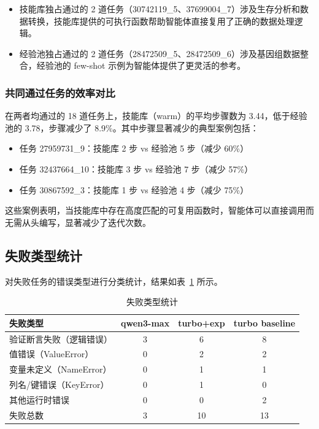 \begin{itemize}
    \item 技能库独占通过的 2 道任务（30742119\_5、37699004\_7）涉及生存分析和数据转换，技能库提供的可执行函数帮助智能体直接复用了正确的数据处理逻辑。
    \item 经验池独占通过的 2 道任务（28472509\_5、28472509\_6）涉及基因组数据整合，经验池的 few-shot 示例为智能体提供了更灵活的参考。
\end{itemize}

\subsubsection{共同通过任务的效率对比}

在两者均通过的 18 道任务上，技能库（warm）的平均步骤数为 3.44，低于经验池的 3.78，步骤减少了 8.9\%。其中步骤显著减少的典型案例包括：

\begin{itemize}
    \item 任务 27959731\_9：技能库 2 步 vs 经验池 5 步（减少 60\%）
    \item 任务 32437664\_10：技能库 3 步 vs 经验池 7 步（减少 57\%）
    \item 任务 30867592\_3：技能库 1 步 vs 经验池 4 步（减少 75\%）
\end{itemize}

这些案例表明，当技能库中存在高度匹配的可复用函数时，智能体可以直接调用而无需从头编写，显著减少了迭代次数。

\subsection{失败类型统计}

对失败任务的错误类型进行分类统计，结果如表~\ref{tab:fail-types} 所示。

\begin{table}[htbp]
    \centering
    \caption{失败类型统计}
    \label{tab:fail-types}
    \begin{tabular}{lccc}
        \toprule
        失败类型 & qwen3-max & turbo+exp & turbo baseline \\
        \midrule
        验证断言失败（逻辑错误） & 3 & 6 & 8 \\
        值错误（ValueError） & 0 & 2 & 2 \\
        变量未定义（NameError） & 0 & 1 & 1 \\
        列名/键错误（KeyError） & 0 & 1 & 0 \\
        其他运行时错误 & 0 & 0 & 2 \\
        \midrule
        失败总数 & 3 & 10 & 13 \\
        \bottomrule
    \end{tabular}
\end{table}

